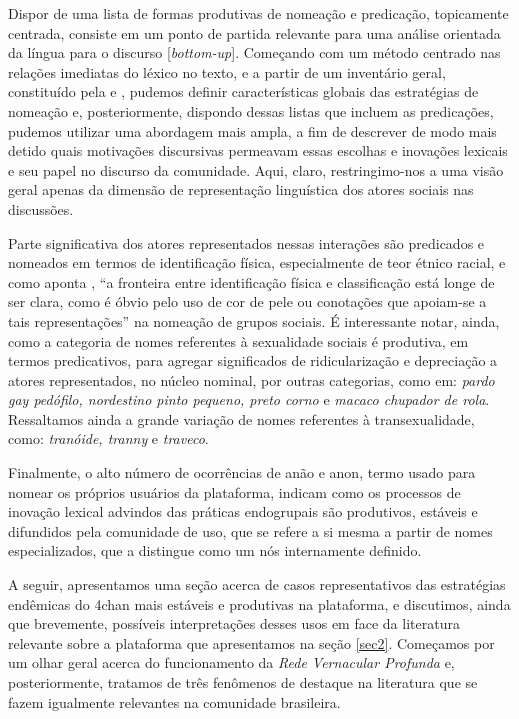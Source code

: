 \documentclass[portuguese]{textolivre}
\begin{document}
Dispor de uma lista de formas produtivas de nomeação e predicação, topicamente centrada, consiste em um ponto de partida relevante para uma análise orientada da língua para o discurso [\emph{bottom-up}]. Começando com um método centrado nas relações imediatas do léxico no texto, e a partir de um inventário geral, constituído pela  e , pudemos definir características globais das estratégias de nomeação e, posteriormente, dispondo dessas listas que incluem as predicações, pudemos utilizar uma abordagem mais ampla, a fim de descrever de modo mais detido quais motivações discursivas permeavam essas escolhas e inovações lexicais e seu papel no discurso da comunidade. Aqui, claro, restringimo-nos a uma visão geral apenas da dimensão de representação linguística dos atores sociais nas discussões.

Parte significativa dos atores representados nessas interações são predicados e nomeados em termos de identificação física, especialmente de teor étnico racial, e como aponta \textcite[p. 58, tradução nossa]{van1996representation}, “a fronteira entre identificação física e classificação está longe de ser clara, como é óbvio pelo uso de cor de pele ou conotações que apoiam-se a tais representações” na nomeação de grupos sociais. É interessante notar, ainda, como a categoria de nomes referentes à sexualidade sociais é produtiva, em termos predicativos, para agregar significados de ridicularização e depreciação a atores representados, no núcleo nominal, por outras categorias, como em: \emph{pardo gay pedófilo, nordestino pinto pequeno, preto corno} e \emph{macaco chupador de rola}. Ressaltamos ainda a grande variação de nomes referentes à transexualidade, como: \emph{tranóide, tranny} e \emph{traveco}. 

Finalmente, o alto número de ocorrências de anão e anon, termo usado para nomear os próprios usuários da plataforma, indicam como os processos de inovação lexical advindos das práticas endogrupais são produtivos, estáveis e difundidos pela comunidade de uso, que se refere a si mesma a partir de nomes especializados, que a distingue como um nós internamente definido.

A seguir, apresentamos uma seção acerca de casos representativos das estratégias endêmicas do 4chan mais estáveis e produtivas na plataforma, e discutimos, ainda que brevemente, possíveis interpretações desses usos em face da literatura relevante sobre a plataforma que apresentamos na seção \ref{sec2}. Começamos por um olhar geral acerca do funcionamento da \emph{Rede Vernacular Profunda} e, posteriormente, tratamos de três fenômenos de destaque na literatura que se fazem igualmente relevantes na comunidade brasileira.
\end{document}
